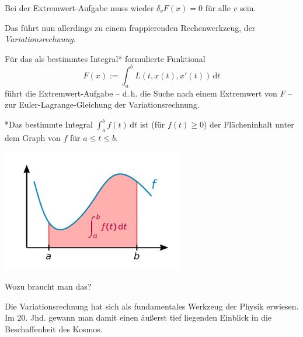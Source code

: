 \documentclass{beamer}
\begin{document}
\begin{frame}
Bei der Extremwert-Aufgabe muss wieder $\delta_v F(x)=0$ für alle
$v$ sein.
\pause

\vspace{0.8em}
Das führt nun allerdings zu einem frappierenden Rechenwerkzeug,
der \emph{Variationsrechnung}.
\end{frame}

\begin{frame}
Für das als bestimmtes Integral* formulierte Funktional
\[F(x) := \int_a^b L(t,x(t),x'(t))\,\mathrm dt\]
führt die Extremwert-Aufgabe -- d.\,h. die Suche nach einem Extremwert
von $F$ -- zur Euler-Lagrange-Gleichung der Variationsrechnung.
\end{frame}

\begin{frame}

{\footnotesize
*Das bestimmte Integral $\int_a^b f(t)\,\mathrm dt$
ist (für $f(t)\ge 0$) der Flächeninhalt unter dem Graph
von $f$ für $a\le t\le b$.}
\begin{center}
\includegraphics[width=80mm]{img/Integral.pdf}
\end{center}
\end{frame}

\begin{frame}
Wozu braucht man das?\pause

\vspace{0.8em}
Die Variationsrechnung hat sich als fundamentales Werkzeug der Physik
erwiesen. Im 20. Jhd. gewann man damit einen äußerst tief liegenden
Einblick in die Beschaffenheit des Kosmos.
\end{frame}
\end{document}
